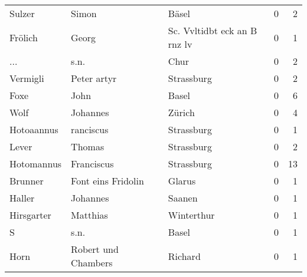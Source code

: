 \begin{center}
\begin{tiny}
\begin{longtabu}{llllrr}
                   Sulzer &                              Simon &             &                                       Bäsel &          0 &         2 \\
                  Frölich &                              Georg &             &                Sc. Vvltidbt eck an B rnz lv &          0 &         1 \\
                      ... &                               s.n. &             &                                        Chur &          0 &         2 \\
                 Vermigli &                        Peter artyr &             &                                  Strassburg &          0 &         2 \\
                     Foxe &                               John &             &                                       Basel &          0 &         6 \\
                     Wolf &                           Johannes &             &                                      Zürich &          0 &         4 \\
               Hotoaannus &                          ranciscus &             &                                  Strassburg &          0 &         1 \\
                    Lever &                             Thomas &             &                                  Strassburg &          0 &         2 \\
               Hotomannus &                         Franciscus &             &                                  Strassburg &          0 &        13 \\
                  Brunner &                 Font eins Fridolin &             &                                      Glarus &          0 &         1 \\
                   Haller &                           Johannes &             &                                      Saanen &          0 &         1 \\
               Hirsgarter &                           Matthias &             &                                  Winterthur &          0 &         1 \\
                        S &                               s.n. &             &                                       Basel &          0 &         1 \\
                     Horn &                Robert und Chambers &             &                                     Richard &          0 &         1 \\

\end{longtabu}
\end{tiny}
\end{center}
